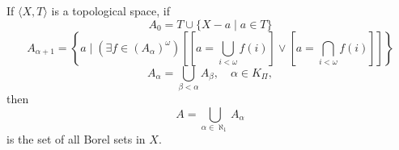 If $\langle X, T \rangle$ is a topological space, if
$$
A_0 = T \cup \{X - a \mid a \in T\}
$$
$$
A_{\alpha+1} = \left\{a \mid (\exists f \in (A_\alpha)^\omega) \left[ \left[ a = \bigcup_{i < \omega} f(i) \right] \vee \left[ a = \bigcap_{i < \omega} f(i) \right] \right] \right\}
$$
$$
A_\alpha = \bigcup_{\beta < \alpha} A_\beta, \quad \alpha \in K_{\Pi},
$$
then
$$
A = \bigcup_{\alpha \in \aleph_1} A_\alpha
$$
is the set of all Borel sets in $X$.

